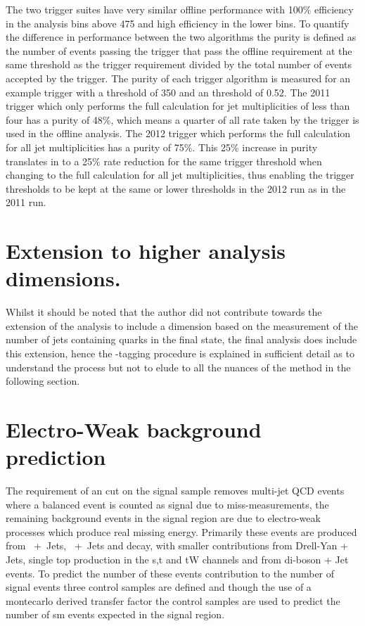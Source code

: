 The two trigger suites have very similar offline performance with 100$\%$ 
efficiency in the analysis bins above \unit{475}{\GeV} and high efficiency in 
the lower bins. To quantify the difference in performance between the two 
algorithms the purity is defined as the number of events passing the trigger 
that pass the offline \alt requirement at the same threshold as the trigger requirement divided by the total number of events 
accepted by the trigger.
The purity of each trigger algorithm is measured for an example trigger with a 
\HT threshold of \unit{350}{\GeV} and an \alt threshold of 0.52.
The 2011 trigger which only performs the full \alt calculation for jet 
multiplicities of less than four has a purity of 48$\%$, which means a quarter 
of all rate taken by the trigger is used in the offline analysis.
The 2012 trigger which performs the full \alt calculation for all jet 
multiplicities has a purity of 75$\%$. This 25$\%$ increase in purity 
translates in to a 25$\%$ rate reduction for the same trigger threshold when
changing to the full \alt calculation for all jet multiplicities, thus enabling 
the trigger thresholds to be kept at the same or lower thresholds in the 2012 
run as in the 2011 run.


\section{Extension to higher analysis dimensions.} %
\label{sec:extension_to_higher_analysis_dimensions_}
Whilst it should be noted that the author did not contribute towards the 
extension of the analysis to include a dimension based on the measurement of 
the number of jets containing \Pbottom quarks in the final state, the final 
analysis does include this extension, hence the \Pbottom-tagging procedure is 
explained in sufficient detail as to understand the process but not to elude to 
all the nuances of the method in the following section.

\clearpage
\section{Electro-Weak background prediction} %
\label{sec:electro_weak_background_prediction}
The requirement of an \alt cut on the signal sample removes multi-jet QCD 
events where a balanced event is counted as signal due to miss-measurements, 
the remaining background events in the signal region are due to electro-weak 
processes which produce real missing energy. Primarily these events are 
produced from \HepProcess{\PZ\to\Pnu\APnu}~+~Jets, 
\HepProcess{\PW\to\Pl\APnu}~+~Jets and \HepProcess{\Ptop\APtop} decay, with 
smaller contributions from Drell-Yan + Jets, single top production in the s,t 
and tW channels and from di-boson + Jet events. To predict the number of these 
events contribution to the number of signal events three control samples are 
defined and though the use of a montecarlo derived transfer factor the control 
samples are used to predict the number of \ac{sm} events expected in the 
signal region.


